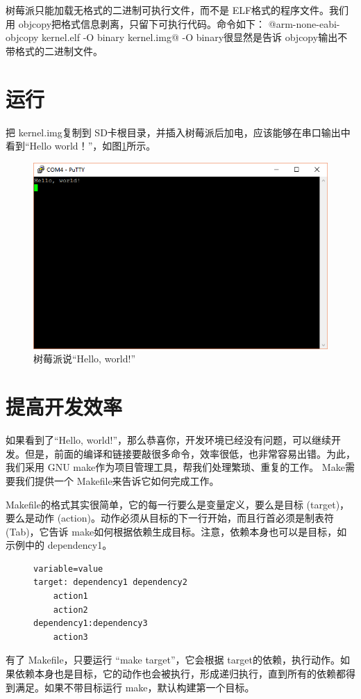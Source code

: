 \documentclass[main.tex]{subfiles}
\begin{document}
\begin{CJK*}{UTF8}{song}
树莓派只能加载无格式的二进制可执行文件，而不是 ELF格式的程序文件。我们用 objcopy把格式信息剥离，只留下可执行代码。命令如下：
@arm-none-eabi-objcopy kernel.elf -O binary kernel.img@
\noindent
-O binary很显然是告诉 objcopy输出不带格式的二进制文件。
\section{运行}
把 kernel.img复制到 SD卡根目录，并插入树莓派后加电，应该能够在串口输出中看到“Hello world！”，如图\ref{figure:2-2}所示。

\begin{figure}[htp]
\centering
\includegraphics[scale=0.5]{figures/2-2.png}
\caption{树莓派说“Hello, world!”}
\label{figure:2-2}
\end{figure}

\section{提高开发效率}
\justify
如果看到了“Hello, world!”，那么恭喜你，开发环境已经没有问题，可以继续开发。但是，前面的编译和链接要敲很多命令，效率很低，也非常容易出错。为此，我们采用 GNU make作为项目管理工具，帮我们处理繁琐、重复的工作。 Make需要我们提供一个 Makefile来告诉它如何完成工作。

\par
 Makefile的格式其实很简单，它的每一行要么是变量定义，要么是目标 (target)，要么是动作 (action)。动作必须从目标的下一行开始，而且行首必须是制表符 (Tab)，它告诉 make如何根据依赖生成目标。注意，依赖本身也可以是目标，如示例中的 dependency1。
\begin{figure}[htp]
\centering
\begin{minipage}{0.4\textwidth}
\begin{verbatim}
variable=value
target: dependency1 dependency2
    action1
    action2
dependency1:dependency3
    action3
\end{verbatim}
\end{minipage}
\end{figure}
\par
有了 Makefile，只要运行 “make target”，它会根据 target的依赖，执行动作。如果依赖本身也是目标，它的动作也会被执行，形成递归执行，直到所有的依赖都得到满足。如果不带目标运行 make，默认构建第一个目标。


\end{CJK*}
\end{document}
